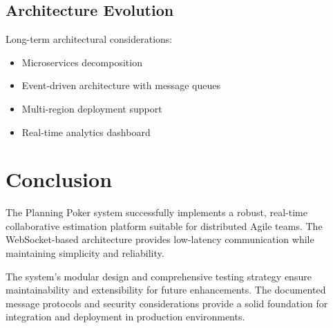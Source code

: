 \documentclass[11pt,a4paper]{article}
\begin{document}
\subsection{Architecture Evolution}

Long-term architectural considerations:

\begin{itemize}
    \item Microservices decomposition
    \item Event-driven architecture with message queues
    \item Multi-region deployment support
    \item Real-time analytics dashboard
\end{itemize}

\section{Conclusion}

The Planning Poker system successfully implements a robust, real-time collaborative estimation platform suitable for distributed Agile teams. The WebSocket-based architecture provides low-latency communication while maintaining simplicity and reliability.

The system's modular design and comprehensive testing strategy ensure maintainability and extensibility for future enhancements. The documented message protocols and security considerations provide a solid foundation for integration and deployment in production environments.



\end{document}
